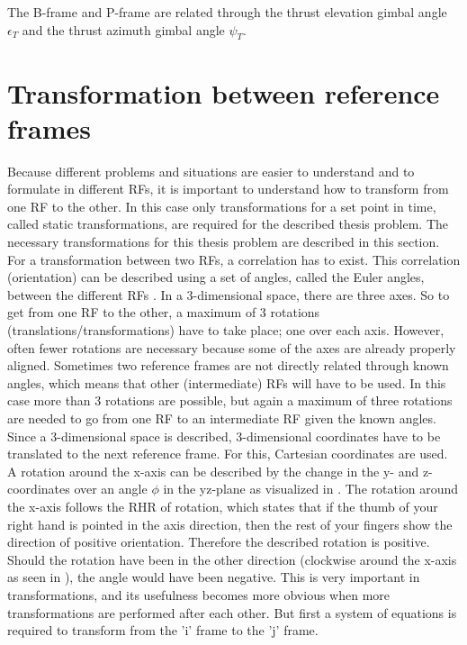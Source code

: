 The B-frame and P-frame are related through the thrust elevation gimbal angle $\epsilon_{T}$ and the thrust azimuth gimbal angle $\psi_{T}$. 

\section{Transformation between reference frames}
\label{sec:transfram}
Because different problems and situations are easier to understand and to formulate in different \ac{RF}s, it is important to understand how to transform from one \ac{RF} to the other. In this case only transformations for a set point in time, called static transformations, are required for the described thesis problem. The necessary transformations for this thesis problem are described in this section.\\
For a transformation between two \ac{RF}s, a correlation has to exist. This correlation (orientation) can be described using a set of angles, called the Euler angles, between the different \ac{RF}s \cite{mooij2013stat}. In a 3-dimensional space, there are three axes. So to get from one \ac{RF} to the other, a maximum of 3 rotations (translations/transformations) have to take place; one over each axis. However, often fewer rotations are necessary because some of the axes are already properly aligned. Sometimes two reference frames are not directly related through known angles, which means that other (intermediate) \ac{RF}s will have to be used. In this case more than 3 rotations are possible, but again a maximum of three rotations are needed to go from one \ac{RF} to an intermediate \ac{RF} given the known angles. Since a 3-dimensional space is described, 3-dimensional coordinates have to be translated to the next reference frame. For this, Cartesian coordinates are used. A rotation around the x-axis can be described by the change in the y- and z-coordinates over an angle $\phi$ in the yz-plane as visualized in . The rotation around the x-axis follows the \ac{RHR} of rotation, which states that if the thumb of your right hand is pointed in the axis direction, then the rest of your fingers show the direction of positive orientation. Therefore the described rotation is positive. Should the rotation have been in the other direction (clockwise around the x-axis as seen in ), the angle would have been negative. This is very important in transformations, and its usefulness becomes more obvious when more transformations are performed after each other. But first a system of equations is required to transform from the 'i' frame to the 'j' frame. 



